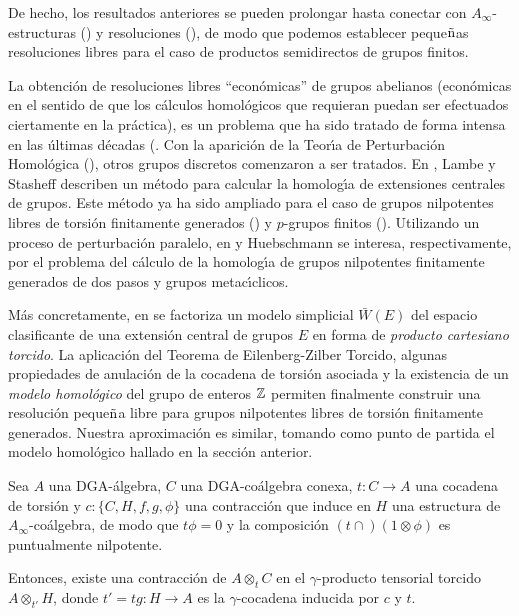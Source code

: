 De hecho, los resultados anteriores se pueden prolongar hasta
conectar con $A_{\infty}$-estructuras
(\cite{Sta63a,Sta63b,Sta70,Kad80,Pro84,GS86,GL89,GLS91,JL96}) y
resoluciones (\cite{Lam91,Lam92,Lam93}), de modo que podemos
establecer peque${\tilde{\mbox{n}}}$as resoluciones libres para el caso de
productos semidirectos de grupos finitos.

La obtenci\'{o}n de resoluciones libres ``econ\'{o}micas'' de grupos abelianos
(econ\'{o}micas en el sentido de que los c\'{a}lculos homol\'{o}gicos que
requieran puedan ser efectuados ciertamente en la pr\'{a}ctica), es un
problema que ha sido tratado de forma intensa en las \'{u}ltimas d\'{e}cadas
(\cite{Eil49,EM54,Car56,CE56,Tat57,Moo76,Hue91e}. Con la aparici\'{o}n de la
Teor\'{\i}a de Perturbaci\'{o}n Homol\'{o}gica
(\cite{Shi61,Bro64,Gug72,GL89,GLS91,HK91}), otros grupos discretos
comenzaron a ser tratados. En \cite{LS87}, Lambe y Stasheff describen
un m\'{e}todo para calcular la homolog\'{\i}a de extensiones centrales de
grupos. Este m\'{e}todo ya ha sido ampliado para el caso de grupos nilpotentes
libres de torsi\'{o}n finitamente generados (\cite{LS87,Lam89,Lam91}) y
$p$-grupos finitos (\cite{Lam92,Lam,EGL97}). Utilizando un proceso de
perturbaci\'{o}n paralelo, en \cite{Hue89} y \cite{Hue91t} Huebschmann se
interesa, respectivamente, por el problema del c\'{a}lculo de la
homolog\'{\i}a de grupos nilpotentes finitamente generados de dos pasos y
grupos metac\'{\i}clicos.

M\'{a}s concretamente, en \cite{LS87} se factoriza un modelo simplicial
$\bar{W}(E)$ del espacio clasificante de una extensi\'{o}n central de grupos
$E$ en forma de {\em producto cartesiano torcido}. La aplicaci\'{o}n del
Teorema de Eilenberg-Zilber Torcido, algunas propiedades de anulaci\'{o}n de
la cocadena de torsi\'{o}n asociada y la existencia de un {\em modelo
homol\'{o}gico} del grupo de enteros ${\Bbb Z}$ permiten finalmente construir una
resoluci\'{o}n peque${\tilde{\mbox{n}}}$a libre para grupos nilpotentes libres de torsi\'{o}n
finitamente generados. Nuestra aproximaci\'{o}n es similar, tomando
como punto de partida el modelo homol\'{o}gico hallado en la
secci\'{o}n anterior.

\begin{thr} \cite{AAR99b}
Sea $A$ una DGA-\'{a}lgebra, $C$ una DGA-co\'{a}lgebra conexa,
$t:C \rightarrow A$ una cocadena de torsi\'{o}n y
$c:\{C,H,f,g,\phi \}$ una contracci\'{o}n que induce en $H$ una
estructura de $A_{\infty}$-co\'{a}lgebra, de modo que $t \phi =0$ y
la composici\'{o}n $(t \cap )(1 \otimes \phi)$ es puntualmente
nilpotente.

Entonces, existe una contracci\'{o}n de $A \otimes _t C$ en el
$\gamma$-producto tensorial torcido $A \otimes _{t'} H$, donde
$t'=tg:H \rightarrow A$ es la $\gamma$-cocadena inducida por $c$ y
$t$.
\end{thr}

